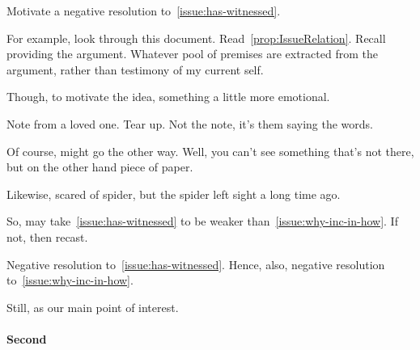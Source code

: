 \begin{note}
  \begin{goal}
    Motivate a negative resolution to~\autoref{issue:has-witnessed}.
  \end{goal}
\end{note}

\begin{note}
  For example, look through this document.
  Read~\autoref{prop:IssueRelation}.
  Recall providing the argument.
  Whatever pool of premises are extracted from the argument, rather than testimony of my current self.

  Though, to motivate the idea, something a little more emotional.

  Note from a loved one.
  Tear up.
  Not the note, it's them saying the words.

  Of course, might go the other way.
  Well, you can't see something that's not there, but on the other hand piece of paper.

  Likewise, scared of spider, but the spider left sight a long time ago.
\end{note}

\begin{note}
  So, may take~\autoref{issue:has-witnessed} to be weaker than~\autoref{issue:why-inc-in-how}.
  If not, then recast.

  Negative resolution to~\autoref{issue:has-witnessed}.
  Hence, also, negative resolution to~\autoref{issue:why-inc-in-how}.

  Still, \iWitness{} as our main point of interest.
\end{note}


\paragraph*{Second }

